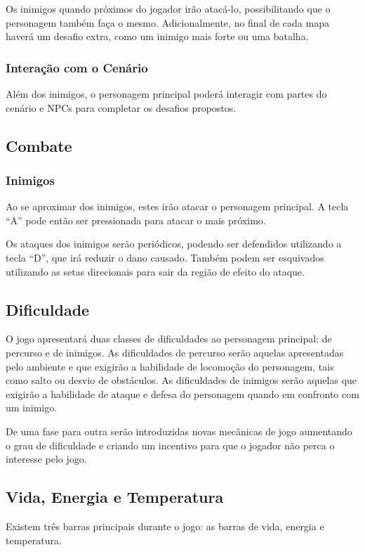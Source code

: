 Os inimigos quando próximos do jogador irão atacá-lo, possibilitando que o 
personagem também faça o mesmo. 
Adicionalmente, no final de cada mapa haverá um desafio extra, como um inimigo
 mais forte ou uma batalha.  

\subsubsection {Interação com o Cenário}

Além dos inimigos, o personagem principal poderá interagir com partes do
 cenário e NPCs para completar os desafios propostos.

\subsection {Combate}
\subsubsection{Inimigos}
Ao se aproximar dos inimigos, estes irão atacar o personagem principal. A
tecla ``A'' pode então ser pressionada para atacar o mais próximo.

Os ataques dos inimigos serão periódicos, podendo ser defendidos utilizando a
 tecla ``D'', que irá reduzir o dano causado. Também podem ser esquivados
 utilizando as setas direcionais para sair da região de efeito do ataque.

\subsection {Dificuldade}
O jogo apresentará duas classes de dificuldades ao personagem principal: de percurso e de
inimigos. As dificuldades de percurso serão aquelas apresentadas pelo ambiente e que exigirão a habilidade
de locomoção do personagem, tais como salto ou desvio de obstáculos. As dificuldades de inimigos serão
aquelas que exigirão a habilidade de ataque e defesa do personagem quando em confronto com um inimigo.

De uma fase para outra serão introduzidas novas mecânicas de jogo aumentando o
grau de dificuldade e criando um incentivo para que o jogador não perca o interesse pelo jogo.

\subsection {Vida, Energia e Temperatura}

Existem três barras principais durante o jogo: as barras de vida, energia e temperatura. 

